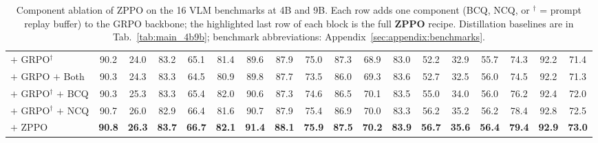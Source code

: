 \begin{table}[!htbp]
{\begin{tabular}{l*{17}{c}}
    $+$ GRPO$^{\dagger}$ & 90.2 & 24.0 & 83.2 & 65.1 & 81.4 & 89.6 & 87.9 & 75.0 & 87.3 & 68.9 & 83.0 & 52.2 & 32.9 & 55.7 & 74.3 & 92.2 & \cellcolor{gray!10}71.4 \\
    $+$ GRPO $+$ Both & 90.3 & 24.3 & 83.3 & 64.5 & 80.9 & 89.8 & 87.7 & 73.5 & 86.0 & 69.3 & 83.6 & 52.7 & 32.5 & 56.0 & 74.5 & 92.2 & \cellcolor{gray!10}71.3 \\
    $+$ GRPO$^{\dagger}$ $+$ BCQ & 90.3 & 25.3 & 83.3 & 65.4 & 82.0 & 90.6 & 87.3 & 74.6 & 86.5 & 70.1 & 83.5 & 55.0 & 34.0 & 56.0 & 76.2 & 92.4 & \cellcolor{gray!10}72.0 \\
    $+$ GRPO$^{\dagger}$ $+$ NCQ & 90.7 & 26.0 & 82.9 & 66.4 & 81.6 & 90.7 & 87.9 & 75.4 & 86.9 & 70.0 & 83.3 & 56.2 & 35.2 & 56.2 & 78.4 & 92.8 & \cellcolor{gray!10}72.5 \\
    \rowcolor{colorful}
    $+$ ZPPO & \textbf{90.8} & \textbf{26.3} & \textbf{83.7} & \textbf{66.7} & \textbf{82.1} & \textbf{91.4} & \textbf{88.1} & \textbf{75.9} & \textbf{87.5} & \textbf{70.2} & \textbf{83.9} & \textbf{56.7} & \textbf{35.6} & \textbf{56.4} & \textbf{79.4} & \textbf{92.9} & \cellcolor{gray!10}\textbf{73.0} \\
    \bottomrule
    \end{tabular}
    }
    \caption{Component ablation of ZPPO on the 16 VLM benchmarks at 4B and 9B. Each row adds one component (BCQ, NCQ, or $^{\dagger}$ = prompt replay buffer) to the GRPO backbone; the highlighted last row of each block is the full \textbf{ZPPO} recipe. Distillation baselines are in Tab.~\ref{tab:main_4b9b}; benchmark abbreviations: Appendix~\ref{sec:appendix:benchmarks}.}
    \label{tab:ablation_4b9b}
\end{table}

